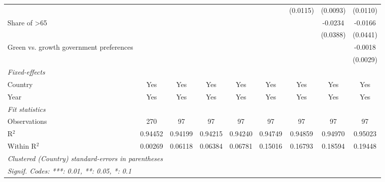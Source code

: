 \begin{table}[htbp]
\begin{tabular}{lcccccccc}
                                              &          &                &          &          &          & (0.0115) & (0.0093) & (0.0110)\\   
      Share of >65                            &          &                &          &          &          &          & -0.0234  & -0.0166\\   
                                              &          &                &          &          &          &          & (0.0388) & (0.0441)\\   
      Green vs. growth government preferences &          &                &          &          &          &          &          & -0.0018\\   
                                              &          &                &          &          &          &          &          & (0.0029)\\   
      \midrule
      \emph{Fixed-effects}\\
      Country                                 & Yes      & Yes            & Yes      & Yes      & Yes      & Yes      & Yes      & Yes\\  
      Year                                    & Yes      & Yes            & Yes      & Yes      & Yes      & Yes      & Yes      & Yes\\  
      \midrule
      \emph{Fit statistics}\\
      Observations                            & 270      & 97             & 97       & 97       & 97       & 97       & 97       & 97\\  
      R$^2$                                   & 0.94452  & 0.94199        & 0.94215  & 0.94240  & 0.94749  & 0.94859  & 0.94970  & 0.95023\\  
      Within R$^2$                            & 0.00269  & 0.06118        & 0.06384  & 0.06781  & 0.15016  & 0.16793  & 0.18594  & 0.19448\\  
      \midrule \midrule
      \multicolumn{9}{l}{\emph{Clustered (Country) standard-errors in parentheses}}\\
      \multicolumn{9}{l}{\emph{Signif. Codes: ***: 0.01, **: 0.05, *: 0.1}}\\
   \end{tabular}
\end{table}


